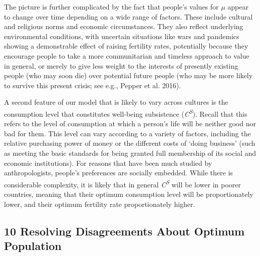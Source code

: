 \documentclass[man,11pt,a4paper,floatsintext]{apa7}
\begin{document}
The picture is further complicated by the fact that people's values for $\mu$ appear to change over time depending on a wide range of factors. These include cultural and religious norms and economic circumstances. They also reflect underlying environmental conditions, with uncertain situations like wars and pandemics showing a demonstrable effect of raising fertility rates, potentially because they encourage people to take a more communitarian and timeless approach to value in general, or merely to give less weight to the interests of presently existing people (who may soon die) over potential future people (who may be more likely to survive this present crisis; see e.g., Pepper et al. 2016).

A second feature of our model that is likely to vary across cultures is the consumption level that constitutes well-being subsistence (\textit{C}\textsuperscript{\textit{S}}). Recall that this refers to the level of consumption at which a person's life will be neither good nor bad for them. This level can vary according to a variety of factors, including the relative purchasing power of money or the different costs of `doing business' (such as meeting the basic standards for being granted full membership of its social and economic institutions). For reasons that have been much studied by anthropologists, people's preferences are socially embedded. While there is considerable complexity, it is likely that in general \textit{C}\textsuperscript{\textit{S}} will be lower in poorer countries, meaning that their optimum consumption level will be proportionately lower, and their optimum fertility rate proportionately higher.

\subsection{10 Resolving Disagreements About Optimum Population}
\end{document}
